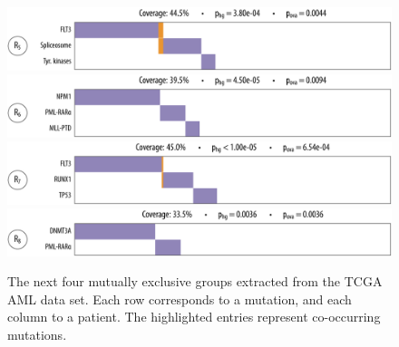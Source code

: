 \begin{figure}[htbp]
\centering
\includegraphics[width=\textwidth]{figures/genes/aml_5.pdf}\\[2em]
\includegraphics[width=\textwidth]{figures/genes/aml_6.pdf}\\[2em]
\includegraphics[width=\textwidth]{figures/genes/aml_7.pdf}\\[2em]
\includegraphics[width=\textwidth]{figures/genes/aml_8.pdf}\\[2em]
\caption{The next four mutually exclusive groups extracted from the TCGA AML data set.
Each row corresponds to a mutation, and each column to a patient.
The highlighted entries represent co-occurring mutations.}
\label{fig:rep_aml_2}
\end{figure}

